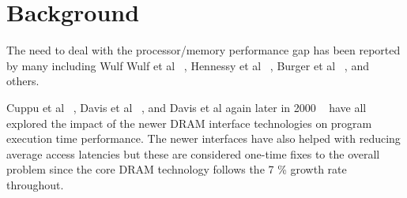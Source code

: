\documentclass[10pt,dvips]{article}
\begin{document}
\section{Background}
%
The need to deal with the processor/memory performance gap has
been reported by many including Wulf
Wulf et al ~\cite{wulf95hitting},
Hennessy et al ~\cite{hennpatt95},
Burger et al ~\cite{burger97limited}, and others.

Cuppu et al ~\cite{cuppu99performance}, Davis et al ~\cite{davis00ddr2},
and Davis et al again later in 2000 ~\cite{davis00new} have
all explored the impact of the newer DRAM interface technologies
on program execution time performance.  
The newer interfaces have also helped with reducing average
access latencies but these are considered one-time fixes to the
overall problem since the core DRAM technology follows the
7 \% growth rate throughout.
%
%
%


\end{document}
